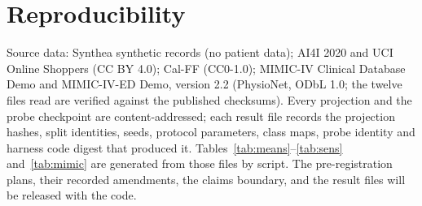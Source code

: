 \documentclass[11pt]{article}
\begin{document}
\section{Reproducibility}

Source data: Synthea synthetic records (no patient data); AI4I 2020 and UCI Online Shoppers (CC BY 4.0); Cal-FF (CC0-1.0); MIMIC-IV Clinical Database Demo and MIMIC-IV-ED Demo, version 2.2 (PhysioNet, ODbL 1.0; the twelve files read are verified against the published checksums). Every projection and the probe checkpoint are content-addressed; each result file records the projection hashes, split identities, seeds, protocol parameters, class maps, probe identity and harness code digest that produced it. Tables~\ref{tab:means}--\ref{tab:sens} and~\ref{tab:mimic} are generated from those files by script. The pre-registration plans, their recorded amendments, the claims boundary, and the result files will be released with the code.
\end{document}
